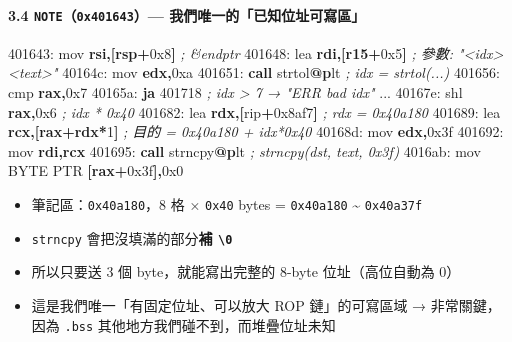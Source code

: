 \documentclass[10pt,a4paper]{article}
\newenvironment{Shaded}{\begin{snugshade}}{\end{snugshade}}
\newcommand{\BaseNTok}[1]{\textcolor[rgb]{0.00,0.00,0.81}{#1}}
\newcommand{\BuiltInTok}[1]{#1}
\newcommand{\CommentTok}[1]{\textcolor[rgb]{0.56,0.35,0.01}{\textit{#1}}}
\newcommand{\ControlFlowTok}[1]{\textcolor[rgb]{0.13,0.29,0.53}{\textbf{#1}}}
\newcommand{\DataTypeTok}[1]{\textcolor[rgb]{0.13,0.29,0.53}{#1}}
\newcommand{\DecValTok}[1]{\textcolor[rgb]{0.00,0.00,0.81}{#1}}
\newcommand{\ErrorTok}[1]{\textcolor[rgb]{0.64,0.00,0.00}{\textbf{#1}}}
\newcommand{\FunctionTok}[1]{\textcolor[rgb]{0.13,0.29,0.53}{\textbf{#1}}}
\newcommand{\KeywordTok}[1]{\textcolor[rgb]{0.13,0.29,0.53}{\textbf{#1}}}
\newcommand{\NormalTok}[1]{#1}
\newcommand{\OperatorTok}[1]{\textcolor[rgb]{0.81,0.36,0.00}{\textbf{#1}}}
\renewenvironment{Shaded}{%
  \def\FrameCommand{\fboxsep=3.2pt\colorbox{shadecolor}}%
  \MakeFramed{\advance\hsize-\width\FrameRestore\small}%
}{%
  \endMakeFramed
}
\providecommand{\tightlist}{%
  \setlength{\itemsep}{0pt}\setlength{\parskip}{0pt}}
\begin{document}
\paragraph{\texorpdfstring{3.4 \texttt{NOTE}（\texttt{0x401643}）---
我們唯一的「已知位址可寫區」}{3.4 NOTE（0x401643）--- 我們唯一的「已知位址可寫區」}}\label{note0x401643-ux6211ux5011ux552fux4e00ux7684ux5df2ux77e5ux4f4dux5740ux53efux5bebux5340}

\begin{Shaded}
\begin{Highlighting}[]
\NormalTok{401643:  }\BuiltInTok{mov}  \KeywordTok{rsi}\OperatorTok{,[}\KeywordTok{rsp}\OperatorTok{+}\BaseNTok{0x8}\OperatorTok{]}     \CommentTok{; \&endptr}
\NormalTok{401648:  }\BuiltInTok{lea}  \KeywordTok{rdi}\OperatorTok{,[}\KeywordTok{r15}\OperatorTok{+}\BaseNTok{0x5}\OperatorTok{]}     \CommentTok{; 參數: "\textless{}idx\textgreater{} \textless{}text\textgreater{}"}
\NormalTok{40164c:  }\BuiltInTok{mov}  \KeywordTok{edx}\OperatorTok{,}\BaseNTok{0xa}
\NormalTok{401651:  }\ControlFlowTok{call}\NormalTok{ strtol}\FunctionTok{@}\ErrorTok{p}\NormalTok{lt        }\CommentTok{; idx = strtol(...)}
\NormalTok{401656:  }\BuiltInTok{cmp}  \KeywordTok{rax}\OperatorTok{,}\BaseNTok{0x7}
\NormalTok{40165a:  }\ControlFlowTok{ja}   \DecValTok{401718}            \CommentTok{; idx \textgreater{} 7 → "ERR bad idx"}
\NormalTok{...}
\NormalTok{40167e:  }\BuiltInTok{shl}  \KeywordTok{rax}\OperatorTok{,}\BaseNTok{0x6}           \CommentTok{; idx * 0x40}
\NormalTok{401682:  }\BuiltInTok{lea}  \KeywordTok{rdx}\OperatorTok{,[}\NormalTok{rip}\OperatorTok{+}\BaseNTok{0x8af7}\OperatorTok{]}  \CommentTok{; rdx = 0x40a180}
\NormalTok{401689:  }\BuiltInTok{lea}  \KeywordTok{rcx}\OperatorTok{,[}\KeywordTok{rax}\OperatorTok{+}\KeywordTok{rdx}\OperatorTok{*}\DecValTok{1}\OperatorTok{]}   \CommentTok{; 目的 = 0x40a180 + idx*0x40}
\NormalTok{40168d:  }\BuiltInTok{mov}  \KeywordTok{edx}\OperatorTok{,}\BaseNTok{0x3f}
\NormalTok{401692:  }\BuiltInTok{mov}  \KeywordTok{rdi}\OperatorTok{,}\KeywordTok{rcx}
\NormalTok{401695:  }\ControlFlowTok{call}\NormalTok{ strncpy}\FunctionTok{@}\ErrorTok{p}\NormalTok{lt       }\CommentTok{; strncpy(dst, text, 0x3f)}
\NormalTok{4016ab:  }\BuiltInTok{mov}  \DataTypeTok{BYTE} \DataTypeTok{PTR} \OperatorTok{[}\KeywordTok{rax}\OperatorTok{+}\BaseNTok{0x3f}\OperatorTok{],}\BaseNTok{0x0}
\end{Highlighting}
\end{Shaded}

\begin{itemize}
\tightlist
\item
  筆記區：\texttt{0x40a180}，8 格 × \texttt{0x40} bytes =
  \texttt{0x40a180} \textasciitilde{} \texttt{0x40a37f}
\item
  \texttt{strncpy} 會把沒填滿的部分\textbf{補
  \texttt{\textbackslash{}\allowbreak{}0}}
\item
  所以只要送 3 個 byte，就能寫出完整的 8-byte 位址（高位自動為 0）
\item
  這是我們唯一「有固定位址、可以放大 ROP 鏈」的可寫區域 → 非常關鍵，因為
  \texttt{.\allowbreak{}bss} 其他地方我們碰不到，而堆疊位址未知
\end{itemize}
\end{document}
